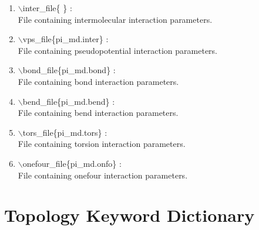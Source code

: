 \documentclass[12pt]{article}
\begin{document}
\begin{enumerate}

 \vspace{0.15in} 
 \item  $\backslash$inter\_file\{ \} : \\
    File containing intermolecular interaction parameters.

 \vspace{0.15in} 
 \item  $\backslash$vps\_file\{pi\_md.inter\} : \\
    File containing pseudopotential interaction parameters.

 \vspace{0.15in} 
 \item  $\backslash$bond\_file\{pi\_md.bond\} : \\
    File containing bond interaction parameters.

 \vspace{0.15in} 
 \item  $\backslash$bend\_file\{pi\_md.bend\} : \\
    File containing bend interaction parameters.

 \vspace{0.15in} 
 \item  $\backslash$tors\_file\{pi\_md.tors\} : \\
    File containing torsion interaction parameters.

 \vspace{0.15in} 
 \item  $\backslash$onefour\_file\{pi\_md.onfo\} : \\
    File containing onefour interaction parameters.

\end{enumerate}

\newpage


\section*{\bf Topology Keyword Dictionary} 
\end{document}
